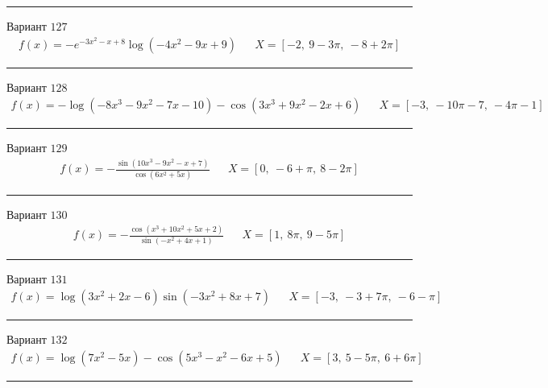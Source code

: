 \documentclass[11pt]{report}
\begin{document}
\begin{center}
    \noindent\rule{8cm}{0.4pt}
\end{center}
Вариант \(127\)
\begin{align*}
    f(x) = - e^{- 3 x^{2} - x + 8} \log{\left(- 4 x^{2} - 9 x + 9 \right)} && X = \left[ -2, \  9 - 3 \pi, \  -8 + 2 \pi\right]
\end{align*}
\begin{center}
    \noindent\rule{8cm}{0.4pt}
\end{center}
Вариант \(128\)
\begin{align*}
    f(x) = - \log{\left(- 8 x^{3} - 9 x^{2} - 7 x - 10 \right)} - \cos{\left(3 x^{3} + 9 x^{2} - 2 x + 6 \right)} && X = \left[ -3, \  - 10 \pi - 7, \  - 4 \pi - 1\right]
\end{align*}
\begin{center}
    \noindent\rule{8cm}{0.4pt}
\end{center}
Вариант \(129\)
\begin{align*}
    f(x) = - \frac{\sin{\left(10 x^{3} - 9 x^{2} - x + 7 \right)}}{\cos{\left(6 x^{2} + 5 x \right)}} && X = \left[ 0, \  -6 + \pi, \  8 - 2 \pi\right]
\end{align*}
\begin{center}
    \noindent\rule{8cm}{0.4pt}
\end{center}
Вариант \(130\)
\begin{align*}
    f(x) = - \frac{\cos{\left(x^{3} + 10 x^{2} + 5 x + 2 \right)}}{\sin{\left(- x^{2} + 4 x + 1 \right)}} && X = \left[ 1, \  8 \pi, \  9 - 5 \pi\right]
\end{align*}
\begin{center}
    \noindent\rule{8cm}{0.4pt}
\end{center}
Вариант \(131\)
\begin{align*}
    f(x) = \log{\left(3 x^{2} + 2 x - 6 \right)} \sin{\left(- 3 x^{2} + 8 x + 7 \right)} && X = \left[ -3, \  -3 + 7 \pi, \  -6 - \pi\right]
\end{align*}
\begin{center}
    \noindent\rule{8cm}{0.4pt}
\end{center}
Вариант \(132\)
\begin{align*}
    f(x) = \log{\left(7 x^{2} - 5 x \right)} - \cos{\left(5 x^{3} - x^{2} - 6 x + 5 \right)} && X = \left[ 3, \  5 - 5 \pi, \  6 + 6 \pi\right]
\end{align*}
\begin{center}
    \noindent\rule{8cm}{0.4pt}
\end{center}
\end{document}
